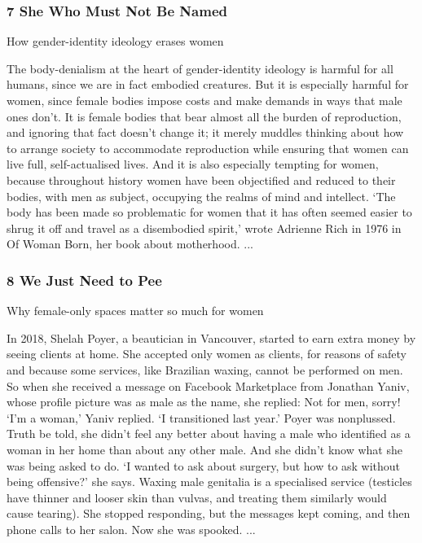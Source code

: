 \documentclass[10pt,titlepage]{book}
\begin{document}
\subsubsection{7 She Who Must Not Be Named}

How gender-identity ideology erases women

The body-denialism at the heart of gender-identity ideology is harmful for all humans, since we are in fact embodied creatures. But it is especially harmful for women, since female bodies impose costs and make demands in ways that male ones don’t. It is female bodies that bear almost all the burden of reproduction, and ignoring that fact doesn’t change it; it merely muddles thinking about how to arrange society to accommodate reproduction while ensuring that women can live full, self-actualised lives. And it is also especially tempting for women, because throughout history women have been objectified and reduced to their bodies, with men as subject, occupying the realms of mind and intellect. ‘The body has been made so problematic for women that it has often seemed easier to shrug it off and travel as a disembodied spirit,’ wrote Adrienne Rich in 1976 in Of Woman Born, her book about motherhood.
...

\subsubsection{8 We Just Need to Pee}

Why female-only spaces matter so much for women

In 2018, Shelah Poyer, a beautician in Vancouver, started to earn extra money by seeing clients at home. She accepted only women as clients, for reasons of safety and because some services, like Brazilian waxing, cannot be performed on men. So when she received a message on Facebook Marketplace from Jonathan Yaniv, whose profile picture was as male as the name, she replied: Not for men, sorry! ‘I’m a woman,’ Yaniv replied. ‘I transitioned last year.’ Poyer was nonplussed. Truth be told, she didn’t feel any better about having a male who identified as a woman in her home than about any other male. And she didn’t know what she was being asked to do. ‘I wanted to ask about surgery, but how to ask without being offensive?’ she says. Waxing male genitalia is a specialised service (testicles have thinner and looser skin than vulvas, and treating them similarly would cause tearing). She stopped responding, but the messages kept coming, and then phone calls to her salon. Now she was spooked.
...
\end{document}
